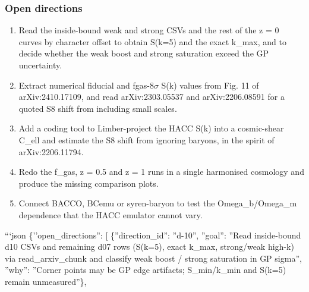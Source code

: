 \documentclass[11pt,a4paper]{article}
\begin{document}
\subsubsection*{Open directions}
\begin{enumerate}
  \item Read the inside-bound weak and strong CSVs and the rest of the z = 0 curves by character offset to obtain S(k=5) and the exact k\_max, and to decide whether the weak boost and strong saturation exceed the GP uncertainty.
  \item Extract numerical fiducial and fgas-8$\sigma$ S(k) values from Fig. 11 of arXiv:2410.17109, and read arXiv:2303.05537 and arXiv:2206.08591 for a quoted S8 shift from including small scales.
  \item Add a coding tool to Limber-project the HACC S(k) into a cosmic-shear C\_ell and estimate the S8 shift from ignoring baryons, in the spirit of arXiv:2206.11794.
  \item Redo the f\_gas, z = 0.5 and z = 1 runs in a single harmonised cosmology and produce the missing comparison plots.
  \item Connect BACCO, BCemu or syren-baryon to test the Omega\_b/Omega\_m dependence that the HACC emulator cannot vary.
\end{enumerate}
```json \{''open\_directions'': [  \{''direction\_id'': ''d-10'', ''goal'': ''Read inside-bound d10 CSVs and remaining d07 rows (S(k=5), exact k\_max, strong/weak high-k) via read\_arxiv\_chunk and classify weak boost / strong saturation in GP sigma'', ''why'': ''Corner points may be GP edge artifacts; S\_min/k\_min and S(k=5) remain unmeasured''\},
\end{document}
